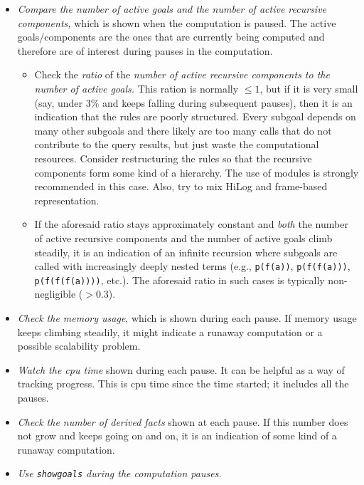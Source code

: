   \begin{itemize}
  \item \emph{Compare the number of active goals and the number of active
      recursive
      components,} which is shown when the computation is paused.
    The active goals/components are the ones that are currently being computed
    and therefore are of interest during pauses in the computation.
    \begin{itemize}
    \item Check the \emph{ratio} of the \emph{number of active recursive
        components to the number of active goals.}  This ration is
      normally $\leq 1$, but if it is very small (say, under 3\% and keeps
      falling during subsequent pauses), then it is an indication that
      the rules are poorly structured. Every subgoal depends on many other
      subgoals and there likely are too many calls that do not contribute
      to the query results, but just waste the computational
      resources. Consider restructuring the rules so that the recursive
      components form some kind of a hierarchy. The use of \ERGO modules is
      strongly recommended in this case. Also, try to mix HiLog and
      frame-based representation.
  \item If the aforesaid ratio stays
    approximately constant and \emph{both} the number of active recursive
    components and the number of active goals climb steadily,
    it is an indication of an infinite recursion where subgoals are
    called with increasingly deeply nested terms (e.g., \texttt{p(f(a))},
    \texttt{p(f(f(a)))}, \texttt{p(f(f(f(a))))}, etc.).
    The aforesaid ratio in such cases is typically non-negligible ($> 0.3$).
    \end{itemize}
  \item \emph{Check the memory usage}, which is shown during each pause.
    If memory usage keeps climbing steadily, it might indicate a runaway
    computation or a possible scalability problem.
  \item \emph{Watch the cpu time} shown during each pause.  It can be
    helpful as a way of tracking progress.
    This is cpu time since the time \ERGO started; it includes all the
    pauses.
  \item \emph{Check the number of derived facts} shown at each pause.
    If this number does not grow and \ERGO keeps going on and on, it is an
    indication of some kind of a runaway computation.
  \item \emph{Use \texttt{showgoals} during the computation pauses.}

\end{itemize}
